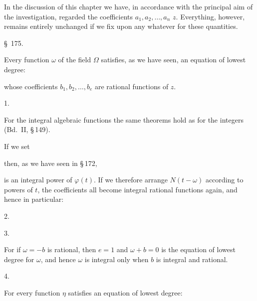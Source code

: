 
In the discussion of this chapter we have, in accordance with the principal aim of the
investigation, regarded the coefficients $a_1, a_2, \ldots, a_n$ 
$z$. Everything, however, remains entirely unchanged if we fix upon any  whatever for these quantities.

\begin{center}
\S\ 175. 
\end{center}

Every function $\omega$ of the field $\Omega$ satisfies, as we have seen, an equation of
lowest degree:


whose coefficients $b_1, b_2, \ldots, b_e$ are rational functions of $z$.

1.\ 

For the integral algebraic functions the same theorems hold as for the integers (Bd.\ II,
\S\,149).

If we set


then, as we have seen in \S\,172,


is an integral power of $\varphi(t)$. If we therefore arrange $N(t-\omega)$ according to
powers of $t$, the coefficients all become integral rational functions again, and hence in
particular:

2.\ 

3.\ 

For if $\omega = -b$ is rational, then $e = 1$ and $\omega + b = 0$ is the equation of
lowest degree for $\omega$, and hence $\omega$ is integral only when $b$ is integral and
rational.

4.\ 

For every function $\eta$ satisfies an equation of lowest degree:

